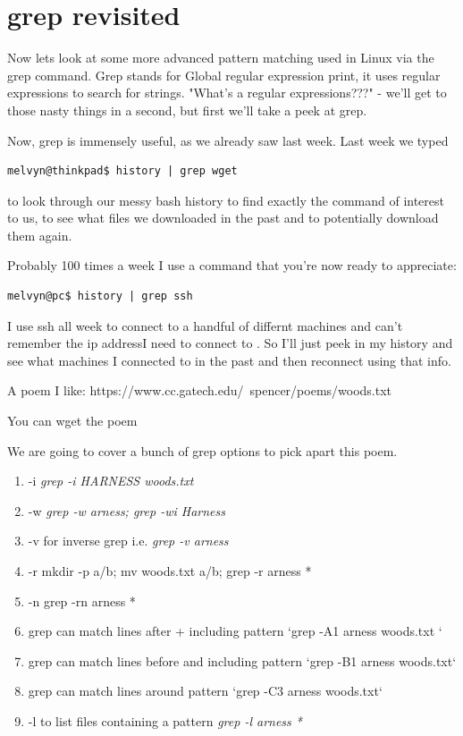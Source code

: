 \documentclass[10pt]{article}
\begin{document}
\section{grep revisited}

Now lets look at some more advanced pattern matching used in Linux via the grep command. 
Grep stands for Global regular expression print, it uses regular expressions to search for strings. "What's a regular expressions???" - we'll get to those nasty things in a second, but first we'll take a peek at grep.

Now, grep is immensely useful, as we already saw last week. Last week we typed

\begin{lstlisting}[style=term]
melvyn@thinkpad$ history | grep wget
\end{lstlisting}

to look through our messy bash history to find exactly the command of interest to us, to see what files we downloaded in the past and to potentially download them again.

Probably  100 times a week I use a command that you're now ready to appreciate:

\begin{lstlisting}
melvyn@pc$ history | grep ssh
\end{lstlisting}

I use ssh all week to connect to a handful of differnt machines and can't
remember the ip addressI need to connect to . So I'll just peek in my history
and see what machines I connected to in the past and then reconnect using that
info.

A poem I like:
https://www.cc.gatech.edu/~spencer/poems/woods.txt

You can wget the poem

We are going to cover a bunch of grep options to pick apart this poem.

\begin{enumerate}
\item -i \textit{grep -i HARNESS woods.txt}
\item -w \textit{grep -w arness; grep -wi Harness} 
\item -v for inverse grep i.e. \textit{grep -v arness} 
\item -r mkdir -p a/b; mv woods.txt a/b; grep -r arness *
\item -n grep -rn arness *
\item grep can match lines after + including pattern `grep -A1 arness woods.txt `
\item grep can match lines before and including pattern  `grep -B1 arness woods.txt`
\item grep can match lines around pattern `grep -C3 arness woods.txt`
\item -l to list files containing a pattern \textit{ grep -l arness * }
\end{enumerate}
\end{document}
